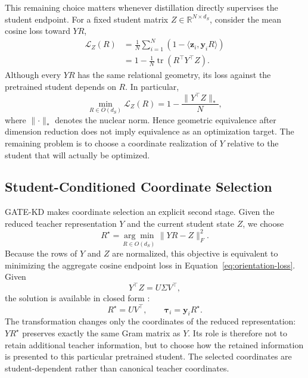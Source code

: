 This remaining choice matters whenever distillation directly supervises the
student endpoint. For a fixed student matrix
$Z\in\mathbb{R}^{N\times d_S}$, consider the mean cosine loss toward $YR$,
\begin{equation}
    \begin{aligned}
        \mathcal{L}_{Z}(R)
        &=\frac{1}{N}\sum_{i=1}^{N}
          \left(1-\langle\mathbf{z}_i,\mathbf{y}_iR\rangle\right) \\
        &=1-\frac{1}{N}\operatorname{tr}\!\left(R^\top Y^\top Z\right).
    \end{aligned}
    \label{eq:orientation-loss}
\end{equation}
Although every $YR$ has the same relational geometry, its loss against the
pretrained student depends on $R$. In particular,
\begin{equation}
    \min_{R\in O(d_S)}\mathcal{L}_{Z}(R)
    =1-\frac{\lVert Y^\top Z\rVert_*}{N},
    \label{eq:orientation-optimum}
\end{equation}
where $\lVert\cdot\rVert_*$ denotes the nuclear norm. Hence geometric
equivalence after dimension reduction does not imply equivalence as an
optimization target. The remaining problem is to choose a coordinate
realization of $Y$ relative to the student that will actually be optimized.

\subsection{Student-Conditioned Coordinate Selection}
\label{sec:coordinate-selection}

GATE-KD makes coordinate selection an explicit second stage. Given the reduced
teacher representation $Y$ and the current student state $Z$, we choose
\begin{equation}
    R^\star
    =\underset{R\in O(d_S)}{\arg\min}\,
      \lVert YR-Z\rVert_F^2.
    \label{eq:procrustes-objective}
\end{equation}
Because the rows of $Y$ and $Z$ are normalized, this objective is equivalent to
minimizing the aggregate cosine endpoint loss in
Equation~\ref{eq:orientation-loss}. Given
\begin{equation}
    Y^\top Z=U\Sigma V^\top,
    \label{eq:procrustes-svd}
\end{equation}
the solution is available in closed form
\citep{schonemann1966procrustes}:
\begin{equation}
    R^\star=UV^\top,
    \qquad
    \boldsymbol{\tau}_i=\mathbf{y}_iR^\star.
    \label{eq:selected-target}
\end{equation}
The transformation changes only the coordinates of the reduced representation:
$YR^\star$ preserves exactly the same Gram matrix as $Y$. Its role is therefore
not to retain additional teacher information, but to choose how the retained
information is presented to this particular pretrained student. The selected
coordinates are student-dependent rather than canonical teacher coordinates.

